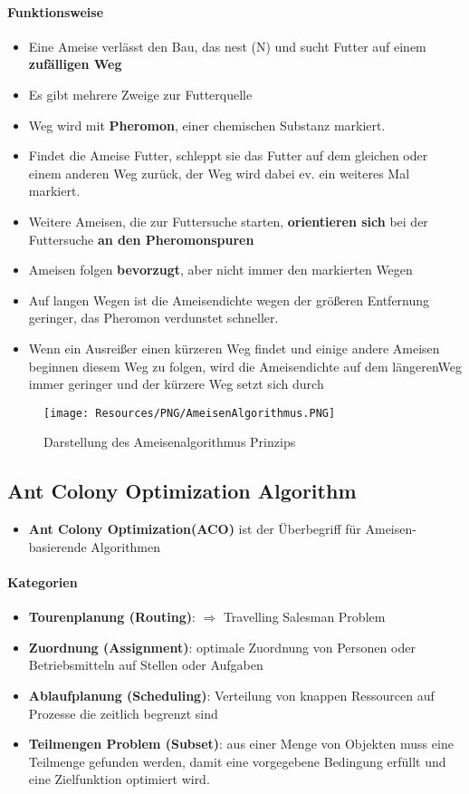 \paragraph{Funktionsweise}
\begin{itemize}
	\item Eine Ameise verlässt den Bau, das nest (N) und sucht Futter auf einem \textbf{zufälligen Weg}
	\item Es gibt mehrere Zweige zur Futterquelle
	\item Weg wird mit \textbf{Pheromon}, einer chemischen Substanz markiert.
	\item Findet die Ameise Futter, schleppt sie das Futter auf dem gleichen oder einem anderen Weg zurück, der Weg wird dabei ev. ein weiteres Mal markiert.
	\item Weitere Ameisen, die zur Futtersuche starten, \textbf{orientieren sich} bei der Futtersuche \textbf{an den Pheromonspuren}
	\item Ameisen folgen \textbf{bevorzugt}, aber nicht immer den markierten Wegen
	\item Auf langen Wegen ist die Ameisendichte wegen der größeren Entfernung geringer, das Pheromon verdunstet schneller.
	\item Wenn ein Ausreißer einen kürzeren Weg findet und einige andere Ameisen beginnen diesem Weg zu folgen, wird die Ameisendichte auf dem längerenWeg immer geringer und der kürzere Weg setzt sich durch
\end{itemize}
\begin{figure}[H]
	\begin{center}
		\texttt{[image: Resources/PNG/AmeisenAlgorithmus.PNG]}
		\caption{Darstellung des Ameisenalgorithmus Prinzips}
		\label{fig:PNG/AmeisenAlgorithmus.PNG}
	\end{center}
\end{figure}
\subsection{Ant Colony Optimization Algorithm}
\begin{itemize}
	\item \textbf{Ant Colony Optimization(ACO)} ist der Überbegriff für Ameisen-basierende Algorithmen
\end{itemize}
\paragraph{Kategorien}
\begin{itemize}
	\item \textbf{Tourenplanung (Routing)}: $\Rightarrow$ Travelling Salesman Problem
	\item \textbf{Zuordnung (Assignment)}: optimale Zuordnung von Personen oder Betriebsmitteln auf Stellen oder Aufgaben
	\item \textbf{Ablaufplanung (Scheduling)}: Verteilung von knappen Ressourcen auf Prozesse die zeitlich begrenzt sind
	\item \textbf{Teilmengen Problem (Subset)}: aus einer Menge von Objekten muss eine Teilmenge gefunden werden, damit eine vorgegebene Bedingung erfüllt und eine Zielfunktion optimiert wird.
\end{itemize}
